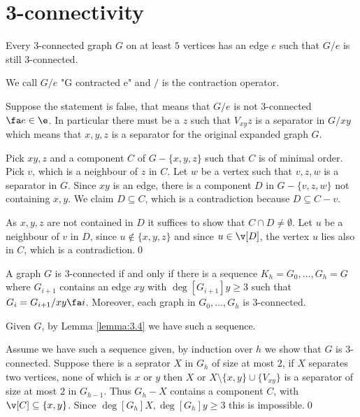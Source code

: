 \section{3-connectivity}
\begin{customlemma}{3.4}
\label{lemma:3.4}
    Every $3$-connected graph $G$ on at least $5$ vertices has an edge $e$ such that $G / e$ is still $3$-connected.
\end{customlemma}
We call $G / e$ "G contracted e" and $/$ is the contraction operator.
\begin{prf}
    Suppose the statement is false, that means that $G / e$ is not $3$-connected $\fa e \in \e$. In particular there must be a $z$ such that $V_{xy}z$ is a separator in $G / xy$ which means that $x, y, z$ is a separator for the original expanded graph $G$.

    Pick $xy, z$ and a component $C$ of $G - \{x, y, z\}$ such that $C$ is of minimal order. Pick $v$, which is a neighbour of $z$ in $C$. Let $w$ be a vertex such that $v, z, w$ is a separator in $G$. Since $xy$ is an edge, there is a component $D$ in $G - \{v, z, w\}$ not containing $x, y$. We claim $D \subseteq C$, which is a contradiction because $D \subseteq C - v$.

    As $x, y, z$ are not contained in $D$ it suffices to show that $C \cap D \neq \emptyset$. Let $u$ be a neighbour of $v$ in $D$, since $u \notin \{x, y, z\}$ and since $u \in \v[D]$, the vertex $u$ lies also in $C$, which is a contradiction.\qed
\end{prf}
\begin{customtheorem}{3.5}
\label{theorem:3.5}
    A graph $G$ is $3$-connected if and only if there is a sequence $K_h = G_0, \dots, G_h = G$ where $G_{i + 1}$ contains an edge $xy$ with $\deg[G_{i + 1}]{y} \geq 3$ such that $G_i = G_{i + 1} / xy \fa i$. Moreover, each graph in $G_0, \dots, G_h$ is $3$-connected.
\end{customtheorem}
\begin{prf}
    Given $G$, by Lemma \ref{lemma:3.4} we have such a sequence.

    Assume we have such a sequence given, by induction over $h$ we show that $G$ is $3$-connected. Suppose there is a seprator $X$ in $G_h$ of size at most $2$, if $X$ separates two vertices, none of which is $x$ or $y$ then $X$ or $X \setminus \{x, y\} \cup \{V_{xy}\}$ is a separator of size at most $2$ in $G_{h - 1}$. Thus $G_h - X$ contains a component $C$, with $\v[C] \subseteq \{x, y\}$. Since $\deg[G_h]{X}, \deg[G_h]{y} \geq 3$ this is impossible.\qed
\end{prf}

